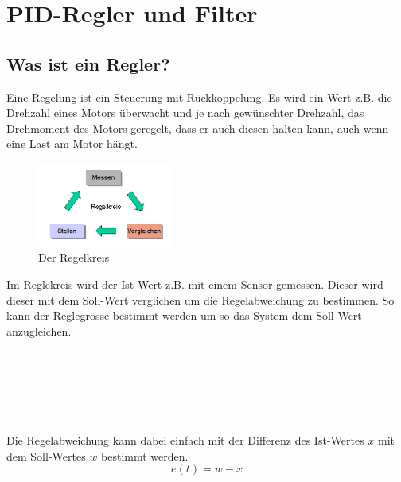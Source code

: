 \documentclass[12pt,a4paper, ngerman]{article}
\begin{document}
\section{PID-Regler und Filter}
\subsection{Was ist ein Regler?}
Eine Regelung ist ein Steuerung mit Rückkoppelung. Es wird ein Wert z.B. die Drehzahl eines Motors überwacht und je nach gewünschter Drehzahl, das Drehmoment des Motors geregelt, dass er auch diesen halten kann, auch wenn eine Last am Motor hängt.\cite{website:rn-wissen_Regelungstechnik}\\
\begin{figure}
\centering
\includegraphics[width=0.4\textwidth]{Regelkreis1.png}
\caption[https://rn-wissen.de/wiki/images/2/25/Regelkreis1.png]{Der Regelkreis}
\end{figure}
Im Reglekreis wird der Ist-Wert z.B. mit einem Sensor gemessen. Dieser wird dieser mit dem Soll-Wert verglichen um die Regelabweichung zu bestimmen. So kann der Reglegrösse bestimmt werden um so das System dem Soll-Wert anzugleichen.\\ \\ \\ \\ \\ \\ \\
Die Regelabweichung kann dabei einfach mit der Differenz des Ist-Wertes $x$ mit dem Soll-Wertes $w$ bestimmt werden.\cite{website:rn-wissen_Regelungstechnik}
\begin{equation}
e(t)=w-x
\end{equation}\\
\end{document}
